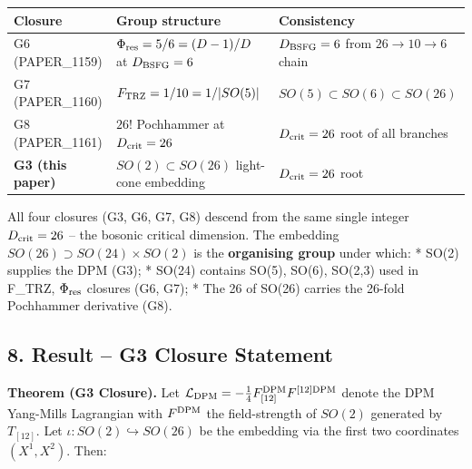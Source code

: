 \documentclass[
]{article}
\newcounter{none} %
\begin{document}
{\def\LTcaptype{none} %
\begin{longtable}[]{@{}
  >{\raggedright\arraybackslash}p{}
  >{\raggedright\arraybackslash}p{}
  >{\raggedright\arraybackslash}p{}@{}}
\toprule\noalign{}
\begin{minipage}[b]{\linewidth}\raggedright
Closure
\end{minipage} & \begin{minipage}[b]{\linewidth}\raggedright
Group structure
\end{minipage} & \begin{minipage}[b]{\linewidth}\raggedright
Consistency
\end{minipage} \\
\midrule\noalign{}
\endhead
\bottomrule\noalign{}
\endlastfoot
G6 (PAPER\_1159) & \(\Phi_{\rm res} = 5/6 = (D-1)/D\) at
\(D_{\rm BSFG}=6\) & \(D_{\rm BSFG}=6\) from \(26\to 10\to 6\) chain \\
G7 (PAPER\_1160) & \(F_{\rm TRZ} = 1/10 = 1/|SO(5)|\) &
\(SO(5)\subset SO(6)\subset SO(26)\) \\
G8 (PAPER\_1161) & \(26!\) Pochhammer at \(D_{\rm crit}=26\) &
\(D_{\rm crit}=26\) root of all branches \\
\textbf{G3 (this paper)} & \(SO(2) \subset SO(26)\) light-cone embedding
& \(D_{\rm crit}=26\) root \\
\end{longtable}
}

All four closures (G3, G6, G7, G8) descend from the same single integer
\(D_{\rm crit} = 26\) -- the bosonic critical dimension. The embedding
\(SO(26) \supset SO(24) \times SO(2)\) is the \textbf{organising group}
under which: * SO(2) supplies the DPM (G3); * SO(24) contains SO(5),
SO(6), SO(2,3) used in F\_TRZ, \(\Phi_{\rm res}\) closures (G6, G7); *
The 26 of SO(26) carries the 26-fold Pochhammer derivative (G8).

\subsection{8. Result -- G3 Closure
Statement}\label{result-g3-closure-statement}

\textbf{Theorem (G3 Closure).} Let
\(\mathcal{L}_{\rm DPM} = -\tfrac{1}{4}F^{\rm DPM}_{[12]}F^{[12]\rm DPM}\)
denote the DPM Yang-Mills Lagrangian with \(F^{\rm DPM}\) the
field-strength of \(SO(2)\) generated by \(T_{[12]}\). Let
\(\iota: SO(2)
\hookrightarrow SO(26)\) be the embedding via the first two coordinates
\((X^1, X^2)\). Then:
\end{document}
